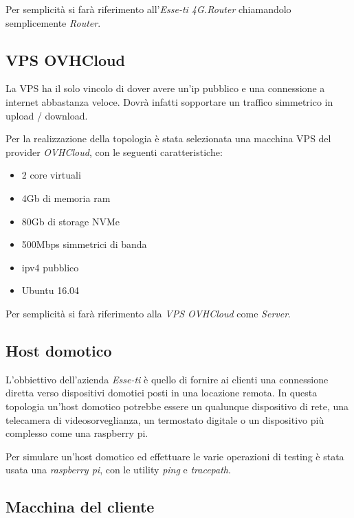 Per semplicità si farà riferimento all'\textit{Esse-ti 4G.Router} chiamandolo semplicemente \textit{Router}.

\subsection{VPS OVHCloud}
\label{subsec:vps-ovhcloud}

La VPS ha il solo vincolo di dover avere un'ip pubblico e una connessione a internet abbastanza veloce. Dovrà infatti sopportare un traffico simmetrico in upload / download.

Per la realizzazione della topologia è stata selezionata una macchina VPS del provider \textit{OVHCloud}, con le seguenti caratteristiche:

\begin{itemize}
	\item 2 core virtuali
	\item 4Gb di memoria ram
	\item 80Gb di storage NVMe
	\item 500Mbps simmetrici di banda
	\item ipv4 pubblico
	\item Ubuntu 16.04
\end{itemize}

Per semplicità si farà riferimento alla \textit{VPS OVHCloud} come \textit{Server}.

\subsection{Host domotico \workinprogress}

L'obbiettivo dell'azienda \textit{Esse-ti} è quello di fornire ai clienti una connessione diretta verso dispositivi domotici posti in una locazione remota. In questa topologia un'host domotico potrebbe essere un qualunque dispositivo di rete, una telecamera di videosorveglianza, un termostato digitale o un dispositivo più complesso come una raspberry pi.

Per simulare un'host domotico ed effettuare le varie operazioni di testing è stata usata una \textit{raspberry pi}, con le utility \textit{ping} e \textit{tracepath}.

\subsection{Macchina del cliente \workinprogress}
\label{subsec:macchina-cliente}

